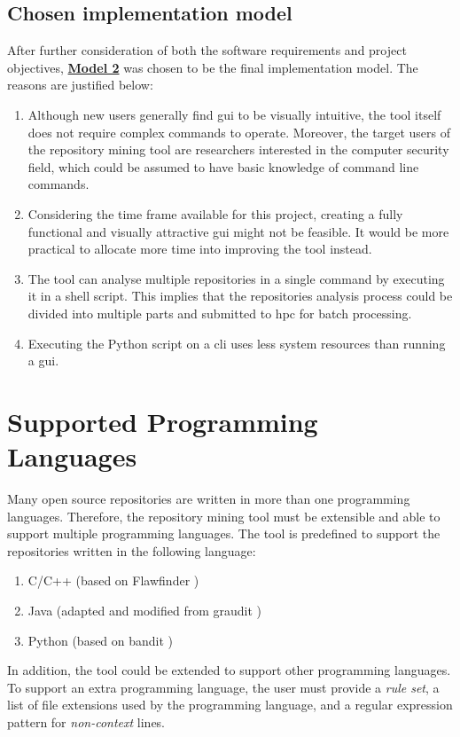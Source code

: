 \documentclass[12pt, a4paper]{report}
\begin{document}
\subsection{Chosen implementation model}
After further consideration of both the software requirements and project objectives,
\hyperref[subsec:model2]{\textbf{Model 2}} was chosen to be the final implementation model. The
reasons are justified below:
\begin{enumerate}
  \item Although new users generally find \acrshort{gui} to be visually intuitive, the tool itself
  does not require complex commands to operate. Moreover, the target users of the repository mining
  tool are researchers interested in the computer security field, which could be assumed to have
  basic knowledge of command line commands.
  \item Considering the time frame available for this project, creating a fully functional and
  visually attractive \acrshort{gui} might not be feasible. It would be more practical to allocate
  more time into improving the tool instead.
  \item The tool can analyse multiple repositories in a single command by executing it in a shell
  script. This implies that the repositories analysis process could be divided into multiple parts
  and submitted to \acrshort{hpc} for batch processing.
  \item Executing the Python script on a \acrshort{cli} uses less system resources than running a
  \acrshort{gui}.
\end{enumerate}

\section{Supported Programming Languages}
Many open source repositories are written in more than one programming languages. Therefore, the
repository mining tool must be extensible and able to support multiple programming languages. The
tool is predefined to support the repositories written in the following language:
\begin{enumerate}
  \item C/C++ (based on Flawfinder \cite{flawfinder})
  \item Java (adapted and modified from graudit \cite{graudit})
  \item Python (based on bandit \cite{bandit})
\end{enumerate}

In addition, the tool could be extended to support other programming languages. To support an extra
programming language, the user must provide a \textit{rule set}, a list of file extensions used by the programming language, and a regular expression pattern for \textit{non-context} lines.
\end{document}
